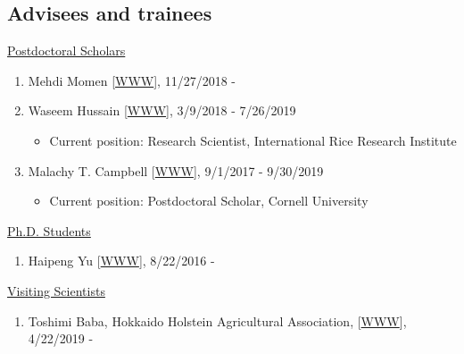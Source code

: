 \documentclass[margin,line,10pt]{res}
\begin{document}
\begin{resume}
\section{\sc Advisees and trainees}

\begin{flushleft}
\hspace{0.2cm} \underline{Postdoctoral Scholars}
\end{flushleft}
\begin{enumerate}

\item Mehdi Momen [\textcolor{blue}{\href{https://mehdimomen.github.io/}{WWW}}], 11/27/2018 - 

  \vspace{0.3cm}
    
\item Waseem Hussain  [\textcolor{blue}{\href{https://whussain2.github.io/}{WWW}}], 3/9/2018 - 7/26/2019
  \begin{itemize} 
  \item Current position: Research Scientist, International Rice Research Institute
  \end{itemize}
   
  \vspace{0.3cm}
  
\item Malachy T. Campbell  [\textcolor{blue}{\href{https://malachycampbell.github.io/}{WWW}}], 9/1/2017 - 9/30/2019
  \begin{itemize} 
  \item Current position: Postdoctoral Scholar, Cornell University 
  \end{itemize}
\end{enumerate}



\begin{flushleft}
\hspace{0.2cm} \underline{Ph.D. Students}
\end{flushleft}
\begin{enumerate}
\item Haipeng Yu [\textcolor{blue}{\href{https://haipengu.github.io/}{WWW}}], 8/22/2016 -
\end{enumerate}




\begin{flushleft}
\hspace{0.2cm} \underline{Visiting Scientists}
\end{flushleft}
\begin{enumerate}
\item Toshimi Baba, Hokkaido Holstein Agricultural Association, [\textcolor{blue}{\href{https://researchmap.jp/t-baba/?lang=english}{WWW}}], 4/22/2019 -
  

\end{enumerate}
\end{resume}
\end{document}
